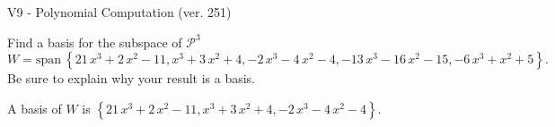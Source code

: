 \begin{exercise}
  \begin{exerciseTitle}V9 - Polynomial Computation (ver. 251)\end{exerciseTitle}
  \begin{exerciseStatement}
    Find a basis for the subspace of \(\mathcal{P}^3\) 
\[W=\mathrm{span}\ \left\{21 \, x^{3} + 2 \, x^{2} - 11 , x^{3} + 3 \, x^{2} + 4 , -2 \, x^{3} - 4 \, x^{2} - 4 , -13 \, x^{3} - 16 \, x^{2} - 15 , -6 \, x^{3} + x^{2} + 5\right\}.\]
 Be sure to explain why your result is a basis.


  \end{exerciseStatement}
  \begin{exerciseAnswer}
   A basis of \(W\) is  \(\left\{21 \, x^{3} + 2 \, x^{2} - 11 , x^{3} + 3 \, x^{2} + 4 , -2 \, x^{3} - 4 \, x^{2} - 4\right\}\).
  


  \end{exerciseAnswer}
\end{exercise}